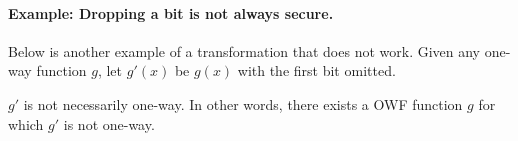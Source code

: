 \documentclass[12pt]{tufte-book}
\begin{document}
\paragraph{Example: Dropping a bit is not always secure.}
Below is another example of a transformation that does not work. Given any one-way function $g$, let $g'(x)$ be $g(x)$ with the first bit omitted.

\begin{claim}
$g'$ is not necessarily one-way. In other words, there exists a OWF function $g$ for which $g'$ is not one-way.
\end{claim}
\end{document}
